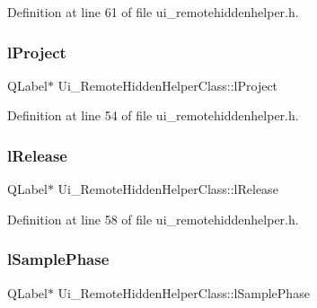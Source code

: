 Definition at line 61 of file ui\+\_\+remotehiddenhelper.\+h.

\hypertarget{class_ui___remote_hidden_helper_class_addc6406f18551bec62d57733aaee4a0e}{}\label{class_ui___remote_hidden_helper_class_addc6406f18551bec62d57733aaee4a0e} 
\subsubsection{\texorpdfstring{l\+Project}{lProject}}
{\footnotesize\ttfamily Q\+Label$\ast$ Ui\+\_\+\+Remote\+Hidden\+Helper\+Class\+::l\+Project}



Definition at line 54 of file ui\+\_\+remotehiddenhelper.\+h.

\hypertarget{class_ui___remote_hidden_helper_class_a2105c5fa8a1d1b475d7773791b32d856}{}\label{class_ui___remote_hidden_helper_class_a2105c5fa8a1d1b475d7773791b32d856} 
\subsubsection{\texorpdfstring{l\+Release}{lRelease}}
{\footnotesize\ttfamily Q\+Label$\ast$ Ui\+\_\+\+Remote\+Hidden\+Helper\+Class\+::l\+Release}



Definition at line 58 of file ui\+\_\+remotehiddenhelper.\+h.

\hypertarget{class_ui___remote_hidden_helper_class_add28abff8a8f0534cdfffeb33ba4faaf}{}\label{class_ui___remote_hidden_helper_class_add28abff8a8f0534cdfffeb33ba4faaf} 
\subsubsection{\texorpdfstring{l\+Sample\+Phase}{lSamplePhase}}
{\footnotesize\ttfamily Q\+Label$\ast$ Ui\+\_\+\+Remote\+Hidden\+Helper\+Class\+::l\+Sample\+Phase}



